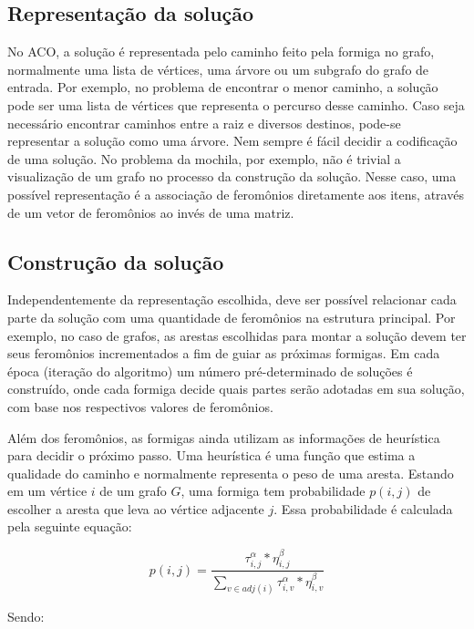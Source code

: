 \FloatBarrier
\subsection{Representação da solução}
No ACO, a solução é representada pelo caminho feito pela formiga no grafo, normalmente uma lista de vértices, uma árvore ou um subgrafo do grafo de entrada. Por exemplo, no problema de encontrar o menor caminho, a solução pode ser uma lista de vértices que representa o percurso desse caminho. Caso seja necessário encontrar caminhos entre a raiz e diversos destinos, pode-se representar a solução como uma árvore. Nem sempre é fácil decidir a codificação de uma solução. No problema da mochila, por exemplo, não é trivial a visualização de um grafo no processo da construção da solução. Nesse caso, uma possível representação é a associação de feromônios diretamente aos itens, através de um vetor de feromônios ao invés de uma matriz.

\subsection{Construção da solução} \label{section_construcao_solucao}
\label{section_otimizacao_aco_construcao}
Independentemente da representação escolhida, deve ser possível relacionar cada parte da solução com uma quantidade de feromônios na estrutura principal. Por exemplo, no caso de grafos, as arestas escolhidas para montar a solução devem ter seus feromônios incrementados a fim de guiar as próximas formigas. Em cada época (iteração do algoritmo) um número pré-determinado de soluções é construído, onde cada formiga decide quais partes serão adotadas em sua solução, com base nos respectivos valores de feromônios.

Além dos feromônios, as formigas ainda utilizam as informações de heurística para decidir o próximo passo. Uma heurística é uma função que estima a qualidade do caminho e normalmente representa o peso de uma aresta. Estando em um vértice $i$ de um grafo $G$, uma formiga tem probabilidade $p(i,j)$ de escolher a aresta que leva ao vértice adjacente $j$. Essa probabilidade é calculada pela seguinte equação:

\[ p(i,j) = \frac{\tau_{i,j}^\alpha * \eta_{i,j}^\beta}{\sum_{v \in adj(i)} \tau_{i,v}^\alpha * \eta_{i,v}^\beta} \]

Sendo:

